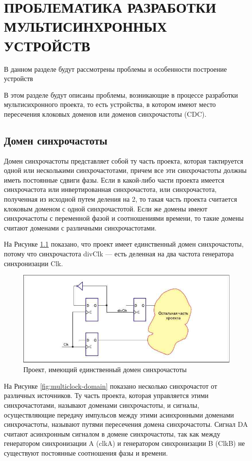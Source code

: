 \newcommand{\erassistant}{ErAssistant~}

\chapter{ПРОБЛЕМАТИКА РАЗРАБОТКИ \\МУЛЬТИСИНХРОННЫХ УСТРОЙСТВ}

В данном разделе будут рассмотрены проблемы и особенности построение устройств


В этом разделе будут описаны проблемы, возникающие в процессе разработки мультисихронного проекта, то есть устройства, в котором имеют место пересечения клоковых доменов или доменов синхрочастоты (CDC).

\section{Домен синхрочастоты}
Домен синхрочастоты представляет собой ту часть проекта, которая тактируется одной или несколькими синхрочастотами, причем все эти синхрочастоты должны иметь постоянные сдвиги фазы. Если в какой-либо части проекта имеется синхрочастота или инвертированная синхрочастота, или синхрочастота, полученная из исходной путем деления на 2, то такая часть проекта считается клоковым доменом с одной синхрочастотой. Если же домены имеют синхрочастоты с переменной фазой и соотношениями времени, то такие домены считают доменами с различными синхрочастотами. 

На Рисунке \ref{fig:clock-domain} показано, что проект имеет единственный домен синхрочастоты, потому что синхрочастота divClk --- есть деленная на два частота генератора синхронизации Clk.

\begin{figure}
	\centering
	\includegraphics[width=0.6\linewidth]{course-scheme/images/clock-domain}
	\caption{Проект, имеющий единственный домен синхрочастоты}
	\label{fig:clock-domain}
\end{figure}


На Рисунке \ref{fig:multiclock-domain} показано несколько синхрочастот от различных источников. Ту часть проекта, которая управляется этими синхрочастотами, называют доменами синхрочастоты, и сигналы, осуществляющие передачу импульсов между этими асинхронными доменами синхрочастоты, называют путями пересечения домена синхрочастоты. Сигнал DA считают асинхронным сигналом в домене синхрочастоты, так как между генератором синхронизации A (clkA) и генератором синхронизации B (ClkB) не существуют постоянные соотношения фазы и времени.

